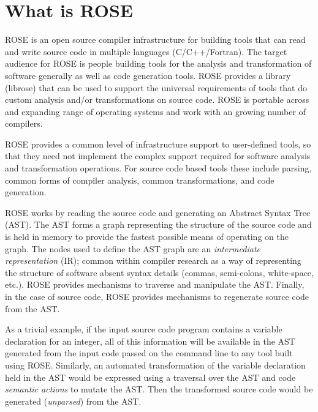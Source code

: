 \section{What is ROSE}

%
   ROSE is an open source compiler infrastructure for building tools that can
read and write source code in multiple languages (C/C++/Fortran).
The target audience for ROSE is people building tools for the analysis
and transformation of software generally as well as code generation tools.
ROSE provides a library (librose) that can be 
used to support the universal requirements of tools that
do custom analysis and/or transformations on source code. ROSE is
portable across and expanding range of operating systems
and work with an growing number of compilers.

   ROSE provides a common level of infrastructure support to
user-defined tools, so that they need not implement the
complex support required for software analysis and transformation operations.
For source code based tools these include parsing, common forms of
compiler analysis, common transformations, and code generation.

   ROSE works by reading the source code
and generating an Abstract Syntax Tree (AST).  The AST forms
a graph representing the structure of the source code
and is held in memory to provide the fastest possible means 
of operating on the graph.  The nodes used to define the AST graph are 
an {\em intermediate representation} (IR); common within compiler research
as a way of representing the structure of software absent syntax details
(commas, semi-colons, white-space, etc.).  ROSE provides mechanisms to 
traverse and manipulate the AST. Finally, in the case of source code, 
ROSE provides mechanisms to regenerate source code from the AST.

   As a trivial example, if the input source code program contains a variable declaration
for an integer, all of this information will be available in the AST generated from
the input code passed on the command line to any tool built using ROSE.
Similarly, an automated transformation of the variable declaration 
held in the AST would be expressed using a traversal over the AST and
code {\em semantic actions} to mutate the AST. Then the transformed source code would be 
generated ({\em unparsed}) from the AST.

